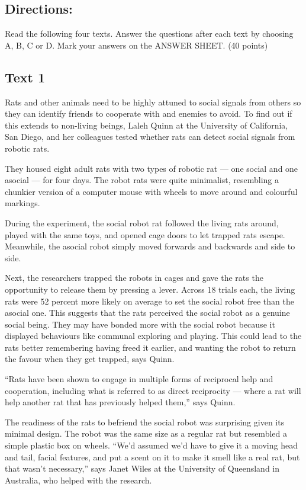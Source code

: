 \documentclass[UTF8,11pt]{ctexart}
\begin{document}
\subsection*{\textbf{Directions:}}


Read the following four texts. Answer the questions after each text by choosing A, B, C or D. Mark your answers on the ANSWER SHEET. (40 points)


\subsection*{\textbf{Text 1}}


Rats and other animals need to be highly attuned to social signals from others so they can identify friends to cooperate with and enemies to avoid. To find out if this extends to non-living beings, Laleh Quinn at the University of California, San Diego, and her colleagues tested whether rats can detect social signals from robotic rats.


They housed eight adult rats with two types of robotic rat — one social and one asocial — for four days. The robot rats were quite minimalist, resembling a chunkier version of a computer mouse with wheels to move around and colourful markings.


During the experiment, the social robot rat followed the living rats around, played with the same toys, and opened cage doors to let trapped rats escape. Meanwhile, the asocial robot simply moved forwards and backwards and side to side.


Next, the researchers trapped the robots in cages and gave the rats the opportunity to release them by pressing a lever. Across 18 trials each, the living rats were 52 percent more likely on average to set the social robot free than the asocial one. This suggests that the rats perceived the social robot as a genuine social being. They may have bonded more with the social robot because it displayed behaviours like communal exploring and playing. This could lead to the rats better remembering having freed it earlier, and wanting the robot to return the favour when they get trapped, says Quinn.


“Rats have been shown to engage in multiple forms of reciprocal help and cooperation, including what is referred to as direct reciprocity — where a rat will help another rat that has previously helped them,” says Quinn.


The readiness of the rats to befriend the social robot was surprising given its minimal design. The robot was the same size as a regular rat but resembled a simple plastic box on wheels. “We’d assumed we’d have to give it a moving head and tail, facial features, and put a scent on it to make it smell like a real rat, but that wasn’t necessary,” says Janet Wiles at the University of Queensland in Australia, who helped with the research.
\end{document}
